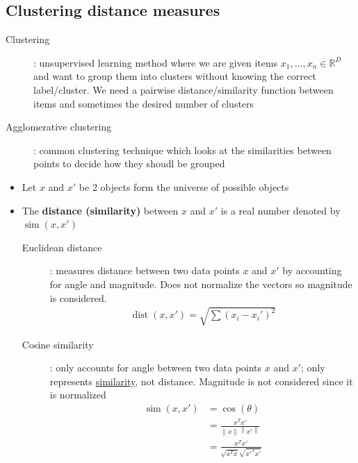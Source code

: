\documentclass[letterpaper,12pt]{article}
\newcommand{\norm}[1]{\left\lVert#1\right\rVert}
\DeclareMathOperator{\dist}{dist}
\DeclareMathOperator{\simi}{sim}
\begin{document}
\subsection{Clustering distance measures}
\begin{description}
 \item[Clustering]: unsupervised learning method where we are given items $x_1, \dots, x_n \in \mathbb{R}^D$ and want to group them into clusters without knowing the correct label/cluster. We need a pairwise distance/similarity function between items and sometimes the desired number of clusters
 \item[Agglomerative clustering]: common clustering technique which looks at the similarities between points to decide how they shoudl be grouped
\end{description}
\begin{itemize}
 \item Let $x$ and $x'$ be 2 objects form the universe of possible objects
 \item The \textbf{distance (similarity)} between $x$ and $x'$ is a real number denoted by $\simi(x,x')$
       \begin{description}
        \item[Euclidean distance]: measures distance between two data points $x$ and $x'$ by accounting for angle and magnitude. Does not normalize the vectors so magnitude is considered.
              \begin{align}
               \dist(x,x') = \sqrt{\sum (x_i - x_i')^2}
              \end{align}
        \item[Cosine similarity]: only accounts for angle between two data points $x$ and $x'$; only represents \underline{similarity}, not distance. Magnitude is not considered since it is normalized
              \begin{align}
               \simi(x,x') & = \cos(\theta)                              \\
                           & = \frac{x^T x'}{\norm{x}\norm{x'}}          \\
                           & = \frac{x^T x'}{\sqrt{x^T x}\sqrt{x'^T x'}}
              \end{align}
       \end{description}
\end{itemize}
\end{document}
